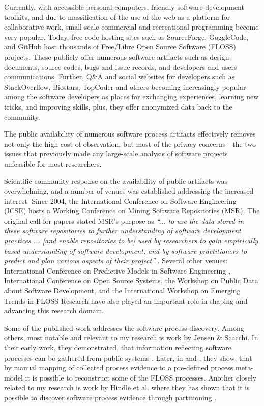 Currently, with accessible personal computers, friendly software development toolkits, and due to massification
of the use of the web as
a platform for collaborative work, small-scale commercial and recreational 
programming become very popular. 
Today, free code hosting sites such as SourceForge, GoggleCode, and GitHub host thousands of 
Free/Libre Open Source Software (FLOSS) projects.
These publicly offer numerous software artifacts such as design documents, source codes, bugs and issue records, and 
developers and users communications.
Further, Q\&A and social websites for developers such as StackOverflow, Biostars, TopCoder and others becoming 
increasingly popular among the software developers as places for exchanging experiences, learning new tricks, and 
improving skills, plus, they offer anonymized data back to the community.

The public availability of numerous software process artifacts effectively removes not only the high cost of observation, 
but most of the privacy concerns - the two issues that previously made any large-scale analysis of software projects 
unfeasible for most researchers.

Scientific community response on the availability of public artifacts was overwhelming, and a number of 
venues was established addressing the increased interest. 
Since 2004, the International Conference on Software Engineering (ICSE) hosts a Working Conference on 
Mining Software Repositories (MSR). The original call for papers stated MSR's purpose as 
\textit{``... to use the data stored in these software repositories to further understanding of software 
development practices ... [and enable repositories to be] used by researchers to gain empirically based 
understanding of software development, and by software practitioners to predict and plan various aspects 
of their project''} \cite{msr2004} \cite{citeulike:7853299}. 
Several other venues: International Conference on Predictive Models in Software Engineering \cite{promise12}, 
International Conference on Open Source Systems, the Workshop on Public Data about Software Development, 
and the International Workshop on Emerging Trends in FLOSS Research have also played
an important role in shaping and advancing this research domain.

Some of the published work addresses the software process discovery. Among others, most notable and 
relevant to my research is work by Jensen \& Scacchi. In their early work, they demonstrated, that 
information reflecting software processes can be gathered from public systems \cite{citeulike:12550640}. 
Later, in \cite{citeulike:5043664} and \cite{citeulike:5128808}, they show, that by manual mapping of 
collected process evidence to a pre-defined process meta-model it is possible to reconstruct some 
of the FLOSS processes. 
Another closely related to my research is work by Hindle et al. where they has shown that it is possible to 
discover software process evidence through partitioning \cite{citeulike:10377366}.

